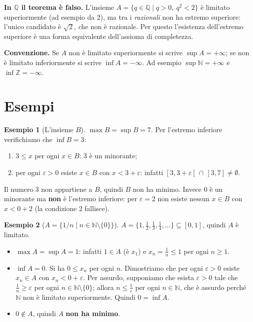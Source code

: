 \documentclass[11pt,a4paper]{article}
\theoremstyle{definition}
\newtheorem*{esempio}{Esempio}
\begin{document}
\textbf{In $\mathbb{Q}$ il teorema è falso.} L'insieme
$A = \{q \in \mathbb{Q} \mid q > 0,\ q^2 < 2\}$ è limitato superiormente
(ad esempio da $2$), ma tra i \emph{razionali} non ha estremo superiore:
l'unico candidato è $\sqrt{2}$, che non è razionale. Per questo l'esistenza
dell'estremo superiore è una forma equivalente dell'assioma di completezza.


\textbf{Convenzione.} Se $A$ non è limitato superiormente si scrive
$\sup A = +\infty$; se non è limitato inferiormente si scrive
$\inf A = -\infty$. Ad esempio $\sup \mathbb{N} = +\infty$ e
$\inf \mathbb{Z} = -\infty$.

\section{Esempi}

\begin{esempio}[L'insieme $B$]
$\max B = \sup B = 7$. Per l'estremo inferiore verifichiamo che $\inf B = 3$:
\begin{enumerate}
    \item $3 \leq x$ per ogni $x \in B$: $3$ è un minorante;
    \item per ogni $\varepsilon > 0$ esiste $x \in B$ con $x < 3 + \varepsilon$:
          infatti $[3, 3 + \varepsilon[ \,\cap\, ]3, 7] \neq \emptyset$.
\end{enumerate}
Il numero $3$ non appartiene a $B$, quindi $B$ non ha minimo. Invece $0$ è
un minorante ma \textbf{non} è l'estremo inferiore: per $\varepsilon = 2$ non
esiste nessun $x \in B$ con $x < 0 + 2$ (la condizione 2 fallisce).
\end{esempio}

\begin{esempio}[$A = \{1/n \mid n \in \mathbb{N} \setminus \{0\}\}$]
$A = \{1, \frac12, \frac13, \frac14, \dots\} \subseteq [0, 1]$, quindi $A$ è
limitato.
\begin{itemize}
    \item $\max A = \sup A = 1$: infatti $1 \in A$ (è $x_1$) e
          $x_n = \frac1n \leq 1$ per ogni $n \geq 1$.
    \item $\inf A = 0$. Si ha $0 \leq x_n$ per ogni $n$. Dimostriamo che per
          ogni $\varepsilon > 0$ esiste $x_n \in A$ con $x_n < 0 + \varepsilon$.
          Per assurdo, supponiamo che esista $\varepsilon > 0$ tale che
          $\frac1n \geq \varepsilon$ per ogni $n \in \mathbb{N} \setminus \{0\}$;
          allora $n \leq \frac1\varepsilon$ per ogni $n \in \mathbb{N}$, che è
          assurdo perché $\mathbb{N}$ non è limitato superiormente. Quindi
          $0 = \inf A$.
    \item $0 \notin A$, quindi $A$ \textbf{non ha minimo}.
\end{itemize}
\end{esempio}
\end{document}
